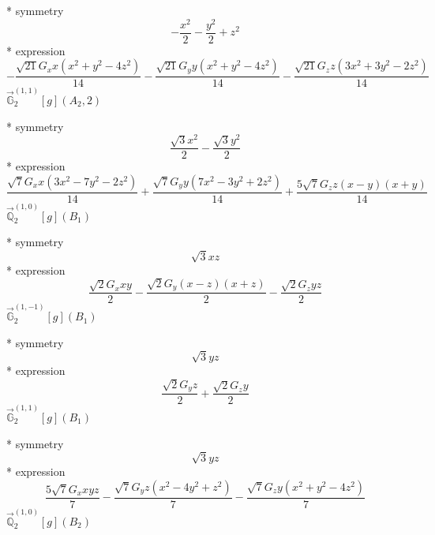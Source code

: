 \documentclass[fleqn,8pt]{jsarticle}
\begin{document}
\noindent\quad ** symmetry
\begin{dmath*}
- \frac{x^{2}}{2} - \frac{y^{2}}{2} + z^{2}
\end{dmath*}
\noindent\quad ** expression
\begin{dmath*}
- \frac{\sqrt{21} G_{x} x \left(x^{2} + y^{2} - 4 z^{2}\right)}{14} - \frac{\sqrt{21} G_{y} y \left(x^{2} + y^{2} - 4 z^{2}\right)}{14} - \frac{\sqrt{21} G_{z} z \left(3 x^{2} + 3 y^{2} - 2 z^{2}\right)}{14}
\end{dmath*}
\noindent\quad $\vec{\mathbb{G}}_{2}^{(1,1)}[g](A_{2},2)$

\noindent\quad ** symmetry
\begin{dmath*}
\frac{\sqrt{3} x^{2}}{2} - \frac{\sqrt{3} y^{2}}{2}
\end{dmath*}
\noindent\quad ** expression
\begin{dmath*}
\frac{\sqrt{7} G_{x} x \left(3 x^{2} - 7 y^{2} - 2 z^{2}\right)}{14} + \frac{\sqrt{7} G_{y} y \left(7 x^{2} - 3 y^{2} + 2 z^{2}\right)}{14} + \frac{5 \sqrt{7} G_{z} z \left(x - y\right) \left(x + y\right)}{14}
\end{dmath*}
\noindent\quad $\vec{\mathbb{Q}}_{2}^{(1,0)}[g](B_{1})$

\noindent\quad ** symmetry
\begin{dmath*}
\sqrt{3} x z
\end{dmath*}
\noindent\quad ** expression
\begin{dmath*}
\frac{\sqrt{2} G_{x} x y}{2} - \frac{\sqrt{2} G_{y} \left(x - z\right) \left(x + z\right)}{2} - \frac{\sqrt{2} G_{z} y z}{2}
\end{dmath*}
\noindent\quad $\vec{\mathbb{G}}_{2}^{(1,-1)}[g](B_{1})$

\noindent\quad ** symmetry
\begin{dmath*}
\sqrt{3} y z
\end{dmath*}
\noindent\quad ** expression
\begin{dmath*}
\frac{\sqrt{2} G_{y} z}{2} + \frac{\sqrt{2} G_{z} y}{2}
\end{dmath*}
\noindent\quad $\vec{\mathbb{G}}_{2}^{(1,1)}[g](B_{1})$

\noindent\quad ** symmetry
\begin{dmath*}
\sqrt{3} y z
\end{dmath*}
\noindent\quad ** expression
\begin{dmath*}
\frac{5 \sqrt{7} G_{x} x y z}{7} - \frac{\sqrt{7} G_{y} z \left(x^{2} - 4 y^{2} + z^{2}\right)}{7} - \frac{\sqrt{7} G_{z} y \left(x^{2} + y^{2} - 4 z^{2}\right)}{7}
\end{dmath*}
\noindent\quad $\vec{\mathbb{Q}}_{2}^{(1,0)}[g](B_{2})$
\end{document}

